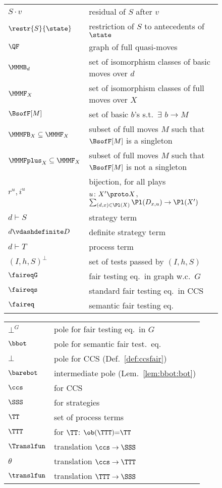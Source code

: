 \documentclass{LMCS}
\theoremstyle{plain}\newtheorem{satz}[thm]{Satz}
\begin{document}
\begin{figure}[p]
\begin{multicols}{2}
\begin{tabular}{lp{.8\linewidth}}
        $S \cdot v$ & residual of $S$ after $v$ \\
        $\restr{S}{\state}$ & restriction of $S$ to antecedents of $\state$ \\
        $\QF$ & graph of full quasi-moves \\
$\MMMB_d$ & set of isomorphism classes of basic moves over $d$ \\
        $\MMMF_X$ & set of isomorphism classes of full moves over $X$ \\
        $\BsofF[M]$ & set of basic $b$'s s.t.\ $\exists$ $b \to M$ \\
        $\MMMFB_X \subseteq \MMMF_X$ & subset of full moves $M$ such
        that $\BsofF[M]$ is a singleton \\
        $\MMMFplus_X \subseteq \MMMF_X$ & subset of full moves $M$ such
        that $\BsofF[M]$ is not a singleton \\
        $r^u, i^u$ &
        bijection, for all plays $u \colon X' \proto X$, 
        $\sum_{(d,x) \in \Pl(X)} \Pl(D_{x,u}) \to \Pl(X')$ \\

        $d \vdash S$ & strategy term \\
        $d \vdashdefinite D$ & definite strategy term \\
        $d \vdash T$ & process term \\

        $(I,h,S)^\bot$ & set of tests passed by $(I,h,S)$ \\

        $\faireqG$ & fair testing eq.\ in graph w.c.\ $G$ \\
        $\faireqs$ & standard fair testing eq.\ in CCS \\
        $\faireq$ & semantic fair testing eq. \\

      \end{tabular}

      \begin{tabular}{lp{.7\linewidth}}

        $\bot^G$ & pole for fair testing eq.\ in $G$ \\
        $\bbot$ & pole for semantic fair test.\ eq. \\
        $\bot$ & pole for CCS (Def.~\ref{def:ccsfair}) \\
        $\barebot$ & intermediate pole (Lem.~\ref{lem:bbot:bot}) \\


        $\ccs$ & \lts{} for CCS \\
        $\SSS$ & \lts{} for strategies \\
        $\TT$ & set of process terms \\
        $\TTT$ & \lts{} for $\TT$: {$\ob (\TTT) {=} \TT$} \\
        $\Translfun$ & translation $\ccs \to \SSS$ \\
        $\theta$ & translation $\ccs \to \TTT$ \\
        $\translfun$ & translation $\TTT \to \SSS$ \\


\end{tabular}
\end{multicols}
\end{figure}
\end{document}

